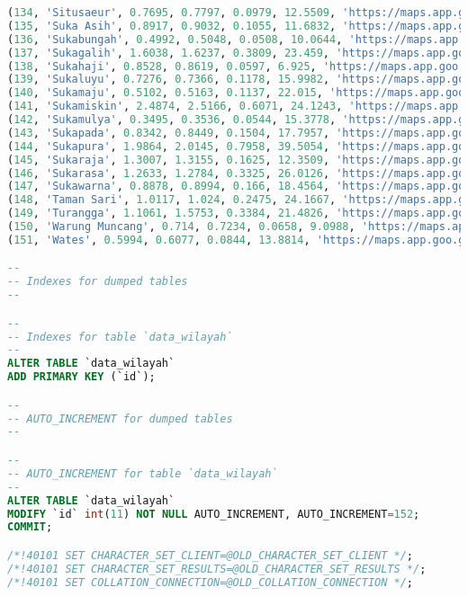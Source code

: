 \begin{lstlisting}[language=SQL]
(134, 'Situsaeur', 0.7695, 0.7797, 0.0979, 12.5509, 'https://maps.app.goo.gl/bPthZDi3nNfdV9Z56'),
(135, 'Suka Asih', 0.8917, 0.9032, 0.1055, 11.6832, 'https://maps.app.goo.gl/GtqBeVBHLWVzCfJ16'),
(136, 'Sukabungah', 0.4992, 0.5048, 0.0508, 10.0644, 'https://maps.app.goo.gl/5vDdnFxZq437GuCu6'),
(137, 'Sukagalih', 1.6038, 1.6237, 0.3809, 23.459, 'https://maps.app.goo.gl/cqDyLG4BgArKQ2Cg6'),
(138, 'Sukahaji', 0.8528, 0.8619, 0.0597, 6.925, 'https://maps.app.goo.gl/pU1yeB95cTvTNW1Q8'),
(139, 'Sukaluyu', 0.7276, 0.7366, 0.1178, 15.9982, 'https://maps.app.goo.gl/tHCJUrazYr2Qme4j8'),
(140, 'Sukamaju', 0.5102, 0.5163, 0.1137, 22.015, 'https://maps.app.goo.gl/qgfGVGfjqxT7638TA'),
(141, 'Sukamiskin', 2.4874, 2.5166, 0.6071, 24.1243, 'https://maps.app.goo.gl/2W7yS8ascHuTVgR36'),
(142, 'Sukamulya', 0.3495, 0.3536, 0.0544, 15.3778, 'https://maps.app.goo.gl/D6gNxLaGtakUgx2V7'),
(143, 'Sukapada', 0.8342, 0.8449, 0.1504, 17.7957, 'https://maps.app.goo.gl/Be7MaAatPv9gmbeB9'),
(144, 'Sukapura', 1.9864, 2.0145, 0.7958, 39.5054, 'https://maps.app.goo.gl/FJhQhynP36VvoLSY9'),
(145, 'Sukaraja', 1.3007, 1.3155, 0.1625, 12.3509, 'https://maps.app.goo.gl/dPyNZetyQEQfXsvU7'),
(146, 'Sukarasa', 1.2633, 1.2784, 0.3325, 26.0126, 'https://maps.app.goo.gl/J18NKNRwaHhF2dfR9'),
(147, 'Sukawarna', 0.8878, 0.8994, 0.166, 18.4564, 'https://maps.app.goo.gl/QjbboN5BKyoYtRXs8'),
(148, 'Taman Sari', 1.0117, 1.024, 0.2475, 24.1667, 'https://maps.app.goo.gl/AarjDTDU5jfzfPGHA'),
(149, 'Turangga', 1.1061, 1.5753, 0.3384, 21.4826, 'https://maps.app.goo.gl/ohvUbNS7PWH25zib8'),
(150, 'Warung Muncang', 0.714, 0.7234, 0.0658, 9.0988, 'https://maps.app.goo.gl/ER8d6omFH9LxWkg96'),
(151, 'Wates', 0.5994, 0.6077, 0.0844, 13.8814, 'https://maps.app.goo.gl/hU6A9dxv6oshGKAN9');

--
-- Indexes for dumped tables
--

--
-- Indexes for table `data_wilayah`
--
ALTER TABLE `data_wilayah`
ADD PRIMARY KEY (`id`);

--
-- AUTO_INCREMENT for dumped tables
--

--
-- AUTO_INCREMENT for table `data_wilayah`
--
ALTER TABLE `data_wilayah`
MODIFY `id` int(11) NOT NULL AUTO_INCREMENT, AUTO_INCREMENT=152;
COMMIT;

/*!40101 SET CHARACTER_SET_CLIENT=@OLD_CHARACTER_SET_CLIENT */;
/*!40101 SET CHARACTER_SET_RESULTS=@OLD_CHARACTER_SET_RESULTS */;
/*!40101 SET COLLATION_CONNECTION=@OLD_COLLATION_CONNECTION */;

\end{lstlisting}
